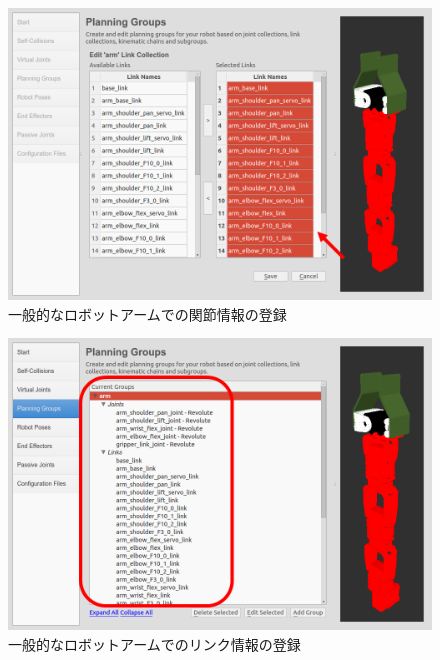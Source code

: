 \begin{figure}[ht]
  \centering
  \includegraphics[width=\columnwidth]{pictures/chapter11/pic_11_23.png}
  \caption{一般的なロボットアームでの関節情報の登録}
\end{figure}

\begin{figure}[ht]
  \centering
  \includegraphics[width=\columnwidth]{pictures/chapter11/pic_11_24.png}
  \caption{一般的なロボットアームでのリンク情報の登録}
\end{figure}


